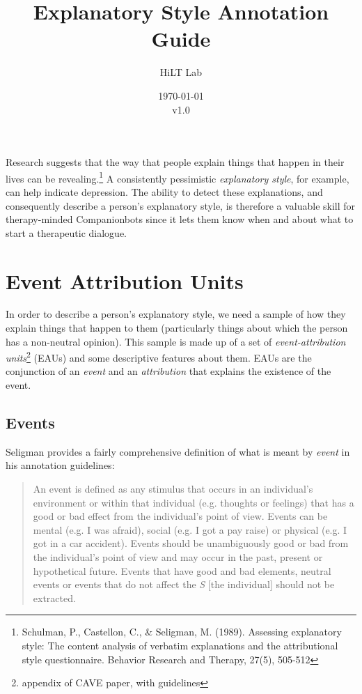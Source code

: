 \documentclass[a4paper,12pt]{article}
\begin{document}
\title{Explanatory Style Annotation Guide}
\author{HiLT Lab}
\date{\today\\v1.0}
\maketitle

\tableofcontents
\break

Research suggests that the way that people explain things that happen in their lives can be revealing.\footnote{\label{seligman89}Schulman, P., Castellon, C., \& Seligman, M. (1989). Assessing explanatory style: The content analysis of verbatim explanations and the attributional style questionnaire. Behavior Research and Therapy, 27(5), 505-512} %
A consistently pessimistic \emph{explanatory style}, for example, can help indicate depression.
The ability to detect these explanations, and consequently describe a person's explanatory style, is therefore a valuable skill for therapy-minded Companionbots since it lets them know when and about what to start a therapeutic dialogue.

\section{Event Attribution Units}
In order to describe a person's explanatory style, we need a sample of how they explain things that happen to them (particularly things about which the person has a non-neutral opinion). %
This sample is made up of a set of \emph{event-attribution units}\footnote{\label{CAVE}appendix of CAVE paper, with guidelines} (EAUs) and some descriptive features about them. %
EAUs are the conjunction of an \emph{event} and an \emph{attribution} that explains the existence of the event.
 

\subsection{Events}

Seligman provides a fairly comprehensive definition of what is meant by \emph{event} in his annotation guidelines: %

\begin{quote}
    An event is defined as any stimulus that occurs in an individual's environment or within that individual (e.g. thoughts or feelings) that has a good or bad effect from the individual's point of view.
    Events can be mental (e.g. I was afraid), social (e.g. I got a pay raise) or physical (e.g. I got in a car accident).
    Events should be unambiguously good or bad from the individual's point of view and may occur in the past, present or hypothetical future.
    Events that have good and bad elements, neutral events or events that do not affect the \emph{S} [the individual] should not be extracted.
\end{quote}
\end{document}
